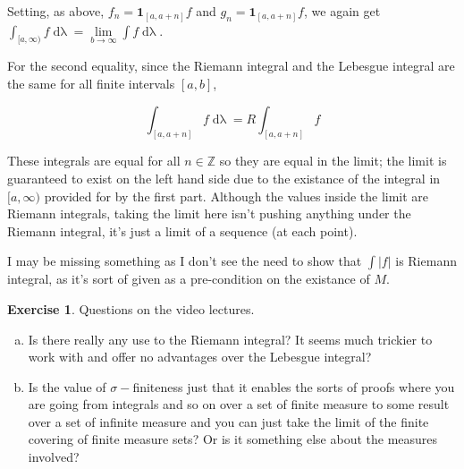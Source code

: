 \documentclass[11pt,oneside]{article}
\numberwithin{equation}{section}
\theoremstyle{definition}
\newtheorem{exercise}{Exercise}
\def\ZZ{\mathbb{Z}}
\def\one{\mathbf{1}}
\begin{document}
\begin{solution}
\begin{enumerate}[(a)]
  Setting, as above, $f_n = \one _ { [a, a+n]} f$ and $g_n = \one _ {[a, a+n]} f$, we again
  get $ \int _{[a, \infty)} f \mathop{d \lambda} = \lim \limits _ { b \to \infty } \int f \mathop{d \lambda}$.

    For the second equality, since the Riemann integral and the Lebesgue integral are the same for all
    finite intervals $[a, b]$,

    \[
    \int _ [a, a+n] f \mathop{d \lambda} = R \int _ {[a, a+n]} f
    \]

    These integrals are equal for all $n \in \ZZ$ so they are equal in
    the limit; the limit is guaranteed to exist on the left hand side
    due to the existance of the integral in $[a, \infty)$ provided for
    by the first part.  Although the values inside the limit are
    Riemann integrals, taking the limit here isn't pushing anything under the
    Riemann integral, it's just a limit of a sequence (at each point).  

    I may be missing something as I don't see the need to show that $\int |f|$ is
    Riemann integral, as it's sort of given as a pre-condition on the existance of $M$.

\end{enumerate}
\end{solution}

\begin{exercise}
  Questions on the video lectures.  
\end{exercise}
\begin{solution}
\begin{enumerate}[(a)]
\item
  Is there really any use to the Riemann integral?  It seems much trickier to work with and offer no advantages over the Lebesgue integral?  
\item
  Is the value of $\sigma-$finiteness just that it enables the sorts of proofs where you are going from integrals and so on over a set of finite
  measure to some result over a set of infinite measure and you can just take the limit of the finite covering of finite measure sets? Or is it
  something else about the measures involved? 
\end{enumerate}
\end{solution}


\begin{comment}
\begin{exercise}
  problem
\end{exercise}
\begin{solution}
\begin{enumerate}[(a)]
\item
  first answer
\end{enumerate}
\end{solution}
\end{comment}
\end{document}
